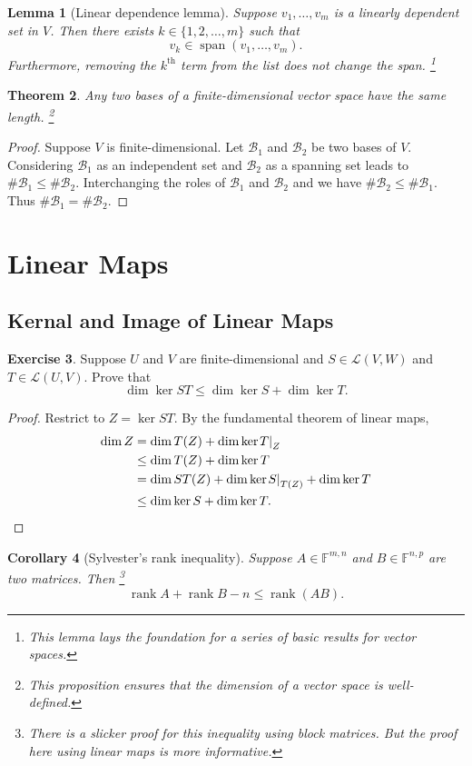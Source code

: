 \documentclass{tufte-handout}
\theoremstyle{plain} %
\newtheorem{thm}{Theorem}
\newtheorem{cor}[thm]{Corollary}
\newtheorem{lem}[thm]{Lemma}
\theoremstyle{definition}
\newtheorem{exer}[thm]{Exercise}
\theoremstyle{remark}
\newcommand{\bra}[1]{\mathopen{}\left(#1\right)}
\newcommand{\rest}[2]{\mathopen{}\left.#1\right|_{#2}}
\newcommand{\F}{\mathbb{F}}
\renewcommand{\L}{\mathcal{L}}
\newcommand{\B}{\mathcal{B}}
\DeclareMathOperator{\spn}{span}
\DeclareMathOperator{\rank}{rank}
\begin{document}
\begin{lem}[Linear dependence lemma]
	Suppose $v_1,\dots,v_m$ is a linearly dependent set in $V$. Then there exists $k\in\{1,2,\dots,m\}$ such that
	\[v_k\in\spn(v_1,\dots,v_m).\]
	Furthermore, removing the $k^\text{th}$ term from the list does not change the span.%
	\footnote{This lemma lays the foundation for a series of basic results for vector spaces.}
\end{lem}

\begin{thm}
	Any two bases of a finite-dimensional vector space have the same length.%
	\footnote{This proposition ensures that the \emph{dimension} of a vector space is well-defined.}
\end{thm}
\begin{proof}
	Suppose $V$ is finite-dimensional. Let $\B_1$ and $\B_2$ be two bases of $V$. Considering $\B_1$ as an independent set and $\B_2$ as a spanning set leads to $\#\B_1\leq\#\B_2$. Interchanging the roles of $\B_1$ and $\B_2$ and we have $\#\B_2\leq\#\B_1$. Thus $\#\B_1=\#\B_2$.
\end{proof}


\section{Linear Maps}
\subsection{Kernal and Image of Linear Maps}
\begin{exer}
	Suppose $U$ and $V$ are finite-dimensional and $S\in\L\bra{V,W}$ and $T\in\L\bra{U,V}$. Prove that
	\[\dim\ker ST \leq \dim\ker S + \dim\ker T.\]
\end{exer}
\begin{proof}
	Restrict to $Z=\ker ST$. By the fundamental theorem of linear maps,
	\begin{align*}
		\dim Z & = \dim T(Z) + \dim\ker \rest{T}{Z} \\
		& \leq \dim T(Z) + \dim\ker T \\
		& = \dim ST(Z) + \dim\ker \rest{S}{T(Z)} + \dim\ker T \\
		& \leq \dim\ker S + \dim\ker T.\qedhere
	\end{align*}
\end{proof}

\begin{cor}[Sylvester's rank inequality]
	Suppose $A\in\F^{m,n}$ and $B\in\F^{n,p}$ are two matrices. Then%
	\footnote{There is a slicker proof for this inequality using block matrices. But the proof here using linear maps is more informative.}
	\[\rank A+\rank B-n\leq\rank\bra{AB}.\]
\end{cor}
\end{document}
